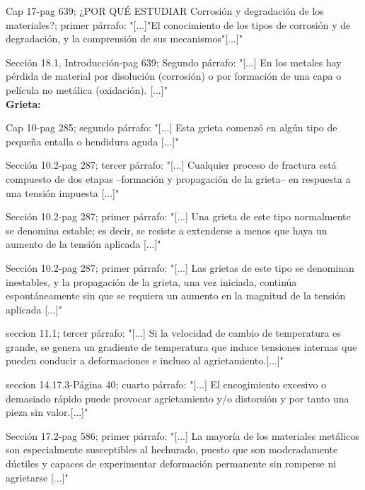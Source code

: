 \documentclass[12pt,a4paper]{article}
\begin{document}
Cap 17-pag 639; ¿POR QUÉ ESTUDIAR Corrosión y degradación de los materiales?; primer párrafo: "[...]"El conocimiento de los tipos de corrosión y de
degradación, y la comprensión de sus mecanismos"[...]"

Sección 18.1, Introducción-pag 639; Segundo párrafo: "[...] En los metales hay pérdida de material por disolución (corrosión) o por formación de una capa o película no metálica (oxidación). [...]"\\[0.1cm]

\textbf{Grieta:}

Cap 10-pag 285; segundo párrafo: "[...] Esta grieta comenzó en algún tipo de pequeña entalla o hendidura aguda [...]"

Sección 10.2-pag 287; tercer párrafo: "[...] Cualquier proceso de fractura está compuesto de dos etapas –formación y propagación de la grieta– en respuesta a una tensión impuesta [...]"

Sección 10.2-pag 287; primer párrafo: "[...] Una grieta de este tipo normalmente se denomina estable; es decir, se resiste a extenderse a menos que haya un aumento de la tensión aplicada [...]"

Sección 10.2-pag 287; primer párrafo: "[...] Las grietas de este tipo se denominan inestables, y la propagación de la grieta, una vez iniciada, continúa espontáneamente sin que se requiera un aumento en la magnitud de la tensión aplicada [...]"

seccion 11.1; tercer párrafo: "[...] Si la velocidad de cambio de temperatura es grande, se genera un gradiente de temperatura que induce tensiones internas que pueden conducir a deformaciones e incluso al agrietamiento.[...]"

seccion 14.17.3-Página 40; cuarto párrafo: "[...] El encogimiento excesivo o demasiado rápido puede provocar agrietamiento y/o distorsión y por tanto una pieza sin	valor.[...]"

Sección 17.2-pag 586; primer párrafo: "[...] La mayoría de los materiales metálicos son especialmente susceptibles al hechurado, puesto que son moderadamente dúctiles y capaces de experimentar deformación permanente sin romperse ni agrietarse [...]"\\[0.1cm]
\end{document}
